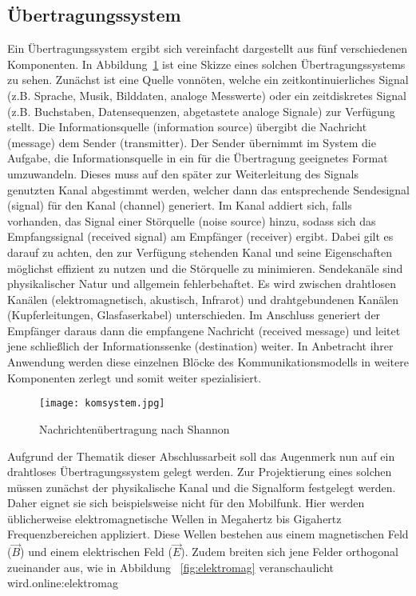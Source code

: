 \subsection{Übertragungssystem}
\label{subsec:aufbauueber}

Ein Übertragungssystem ergibt sich vereinfacht dargestellt aus fünf verschiedenen Komponenten. In Abbildung~\ref{fig:komsystem} ist eine Skizze eines solchen Übertragungssystems zu sehen. Zunächst ist eine Quelle vonnöten, welche ein zeitkontinuierliches Signal (z.B. Sprache, Musik, Bilddaten, analoge Messwerte) oder ein zeitdiskretes Signal (z.B. Buchstaben, Datensequenzen, abgetastete analoge Signale) zur Verfügung stellt. Die Informationsquelle (information source) übergibt die Nachricht (message) dem Sender (transmitter). Der Sender übernimmt im System die Aufgabe, die Informationsquelle in ein für die Übertragung geeignetes Format umzuwandeln. Dieses muss auf den später zur Weiterleitung des Signals genutzten Kanal abgestimmt werden, welcher dann das entsprechende Sendesignal (signal) für den Kanal (channel) generiert. Im Kanal addiert sich, falls vorhanden, das Signal einer Störquelle (noise source) hinzu, sodass sich das Empfangssignal (received signal) am Empfänger (receiver) ergibt. Dabei gilt es darauf zu achten, den zur Verfügung stehenden Kanal und seine Eigenschaften möglichst effizient zu nutzen und die Störquelle zu minimieren. Sendekanäle sind physikalischer Natur und allgemein fehlerbehaftet. Es wird zwischen drahtlosen Kanälen (elektromagnetisch, akustisch, Infrarot) und drahtgebundenen Kanälen (Kupferleitungen, Glasfaserkabel) unterschieden. Im Anschluss generiert der Empfänger daraus dann die empfangene Nachricht (received message) und leitet jene schließlich der Informationssenke (destination) weiter. In Anbetracht ihrer Anwendung werden diese einzelnen Blöcke des Kommunikationsmodells in weitere Komponenten zerlegt und somit weiter spezialisiert. \cite{wernerNachrichtentechnikEinfuehrungFuer2010}

\begin{figure}[H]
	\centering
	\texttt{[image: komsystem.jpg]}
	\caption[Nachrichtenübertragung nach Shannon]{Nachrichtenübertragung nach Shannon} 
	\cite{shannon}
	\label{fig:komsystem}
\end{figure}

Aufgrund der Thematik dieser Abschlussarbeit soll das Augenmerk nun auf ein drahtloses Übertragungssystem gelegt werden. Zur Projektierung eines solchen müssen zunächst der physikalische Kanal und die Signalform festgelegt werden.
Daher eignet sie sich beispielsweise nicht für den Mobilfunk. Hier werden üblicherweise elektromagnetische Wellen in Megahertz bis Gigahertz Frequenzbereichen appliziert. Diese Wellen bestehen aus einem magnetischen Feld ($\vec{B}$) und einem elektrischen Feld ($\vec{E}$). Zudem breiten sich jene Felder orthogonal zueinander aus, wie in Abbildung ~\ref{fig:elektromag} veranschaulicht wird.\gls{online:elektromag} 

